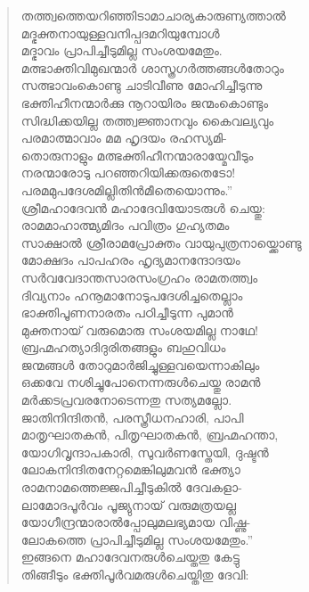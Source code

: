\begin{verse}
തത്ത്വത്തെയറിഞ്ഞിടാമാചാര്യകാരുണ്യത്താല്‍\\
മദ്ഭക്തനായുള്ളവനിപ്പദമറിയുമ്പോള്‍\\
മദ്ഭാവം പ്രാപിച്ചീടുമില്ല സംശയമേതും.\\
മത്ഭാക്തിവിമുഖന്മാര്‍ ശാസ്ത്രഗര്‍ത്തങ്ങള്‍തോറും\\
സത്ഭാവംകൊണ്ടു ചാടിവീണു മോഹിച്ചീടുന്നു\\
ഭക്തിഹീനന്മാര്‍ക്കു നൂറായിരം ജന്മംകൊണ്ടും\\
സിദ്ധിക്കയില്ല തത്ത്വജ്ഞാനവും കൈവല്യവും\\
പരമാത്മാവാം മമ ഹൃദയം രഹസ്യമി-\\
തൊരുനാളും മത്ഭക്തിഹീനന്മാരായ്മേവീടും\\
നരന്മാരോടു പറഞ്ഞറിയിക്കരുതെടോ!\\
പരമമുപദേശമില്ലിതിന്‍മീതെയൊന്നും.”\\
ശ്രീമഹാദേവന്‍ മഹാദേവിയോടരുള്‍ ചെയ്തു:\\
രാമമാഹാത്മ്യമിദം പവിത്രം ഗുഹ്യതമം\\
സാക്ഷാല്‍ ശ്രീരാമപ്രോക്തം വായുപുത്രനായ്ക്കൊണ്ടു\\
മോക്ഷദം പാപഹരം ഹൃദ്യമാനന്ദോദയം\\
സര്‍വവേദാന്തസാരസംഗ്രഹം രാമതത്ത്വം\\
ദിവ്യനാം ഹനൂമാനോടുപദേശിച്ചതെല്ലാം\\
ഭാക്തിപൂണനാരതം പഠിച്ചീടുന്ന പുമാന്‍\\
മുക്തനായ് വരുമൊരു സംശയമില്ല നാഥേ!\\
ബ്രഹ്മഹത്യാദിദുരിതങ്ങളും ബഹുവിധം\\
ജന്മങ്ങള്‍ തോറുമാര്‍ജിച്ചുള്ളവയെന്നാകിലും\\
ഒക്കവേ നശിച്ചുപോനെന്നരുള്‍ചെയ്തു രാമന്‍\\
മര്‍ക്കടപ്രവരനോടെന്നതു സത്യമല്ലോ.\\
ജാതിനിന്ദിതന്‍, പരസ്ത്രീധനഹാരി, പാപി\\
മാതൃഘാതകന്‍, പിതൃഘാതകന്‍, ബ്രഹ്മഹന്താ,\\
യോഗിവൃന്ദാപകാരി, സുവര്‍ണസ്തേയി, ദുഷ്ടന്‍\\
ലോകനിന്ദിതനേറ്റമെങ്കിലുമവന്‍ ഭക്ത്യാ\\
രാമനാമത്തെജ്ജപിച്ചീടുകില്‍ ദേവകളാ-\\
ലാമോദപൂര്‍വം പൂജ്യുനായ് വരുമത്രയല്ല\\
യോഗീന്ദ്രന്മാരാല്‍പ്പോലുമലഭ്യമായ വിഷ്ണു-\\
ലോകത്തെ പ്രാപിച്ചീടുമില്ല സംശയമേതും.”\\
ഇങ്ങനെ മഹാദേവനരുള്‍ചെയ്തതു കേട്ടു\\
തിങ്ങീടും ഭക്തിപൂര്‍വമരുള്‍ചെയ്തിതു ദേവി:\\

\end{verse}
